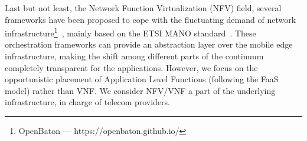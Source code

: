 Last but not least, the Network Function Virtualization (NFV) field, several frameworks have been proposed to cope with the fluctuating demand of network infrastructure\footnote{OpenBaton --- https://openbaton.github.io/}~\cite{cloudify14}, mainly based on the ETSI MANO standard~\cite{etsimano17}. These orchestration frameworks can provide an abstraction layer over the mobile edge infrastructure, making the shift among different parts of the continuum completely transparent for the applications. However, we focus on the opportunistic placement of Application Level Functions (following the FaaS model) rather than VNF. We consider NFV/VNF a part of the underlying infrastructure, in charge of telecom providers.





